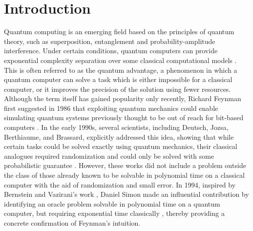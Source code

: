 \documentclass[aps,prl,twocolumn,superscriptaddress,groupedaddress]{revtex4}  %
\begin{document}
\begin{abstract}
\end{abstract}
\maketitle
\section{\label{sec:intro} Introduction}

Quantum computing is an emerging field based on the principles of quantum theory, such as superposition, entanglement and probability-amplitude interference. Under certain conditions, quantum computers can provide exponential complexity separation over some classical computational models \citep{Shor_1994}. 
This is often referred to as the quantum advantage, a phenomenon in which a quantum computer can solve a task which is either impossible for a classical computer, or it improves the precision of the solution using fewer resources.
Although the term itself has gained popularity only recently, Richard Feynman first suggested in 1986 that exploiting quantum mechanics could enable simulating quantum systems previously thought to be out of reach for bit-based computers \cite{Feynman85}. In the early 1990s, several scientists, including Deutsch, Jozsa, Berthiaume, and Brassard, explicitly addressed this idea, showing that while certain tasks could be solved exactly using quantum mechanics, their classical analogues required randomization and could only be solved with some probabilistic guarantee \cite{DeutschJozsa1992, BerthiaumeBrassard1992a, BerthiaumeBrassard1992b}. However, these works did not include a problem outside the class of those already known to be solvable in polynomial time on a classical computer with the aid of randomization and small error. In 1994, inspired by Bernstein and Vazirani's work \cite{BernsteinVazirani97}, Daniel Simon made an influential contribution by identifying an oracle problem solvable in polynomial time on a quantum computer, but requiring exponential time classically \cite{Simon94}, thereby providing a concrete confirmation of Feynman’s intuition.
\end{document}
